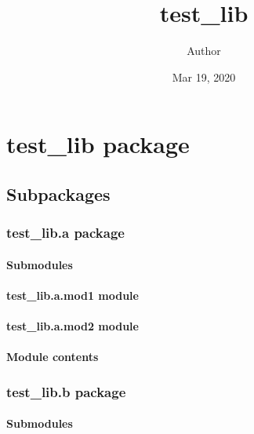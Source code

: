 \documentclass[letterpaper,10pt,dvipdfmx]{sphinxmanual}
\title{test\_lib}
\date{Mar 19, 2020}
\author{Author}
\begin{document}
\pagestyle{empty}
\sphinxmaketitle
\pagestyle{plain}
\sphinxtableofcontents
\pagestyle{normal}
\label{\detokenize{index::doc}}



\chapter{test\_lib package}
\label{\detokenize{test_lib:test-lib-package}}\label{\detokenize{test_lib::doc}}

\section{Subpackages}
\label{\detokenize{test_lib:subpackages}}

\subsection{test\_lib.a package}
\label{\detokenize{test_lib.a:test-lib-a-package}}\label{\detokenize{test_lib.a::doc}}

\subsubsection{Submodules}
\label{\detokenize{test_lib.a:submodules}}

\subsubsection{test\_lib.a.mod1 module}
\label{\detokenize{test_lib.a:test-lib-a-mod1-module}}

\subsubsection{test\_lib.a.mod2 module}
\label{\detokenize{test_lib.a:test-lib-a-mod2-module}}

\subsubsection{Module contents}
\label{\detokenize{test_lib.a:module-contents}}

\subsection{test\_lib.b package}
\label{\detokenize{test_lib.b:test-lib-b-package}}\label{\detokenize{test_lib.b::doc}}

\subsubsection{Submodules}
\label{\detokenize{test_lib.b:submodules}}
\end{document}
